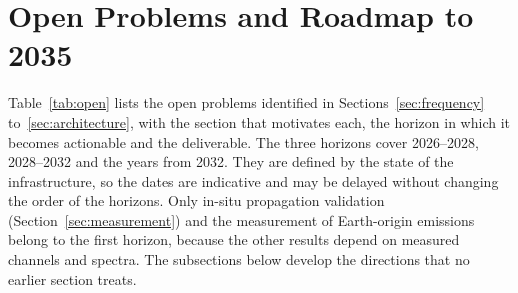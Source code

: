 \documentclass{IEEEoj}
\begin{document}
\section{Open Problems and Roadmap to 2035}
\label{sec:open}
Table~\ref{tab:open} lists the open problems identified in Sections~\ref{sec:frequency} to~\ref{sec:architecture}, with the section that motivates each, the horizon in which it becomes actionable and the deliverable. The three horizons cover 2026--2028, 2028--2032 and the years from 2032. They are defined by the state of the infrastructure, so the dates are indicative and may be delayed without changing the order of the horizons. Only in-situ propagation validation (Section~\ref{sec:measurement}) and the measurement of Earth-origin emissions belong to the first horizon, because the other results depend on measured channels and spectra. The subsections below develop the directions that no earlier section treats.
\end{document}
